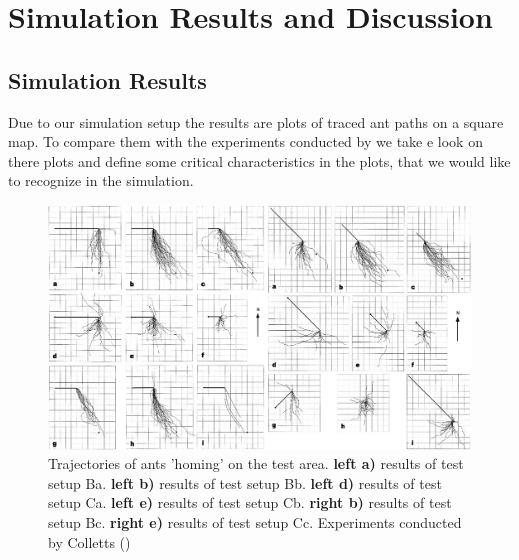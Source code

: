 \documentclass[11pt]{article}
\begin{document}
\section{Simulation Results and Discussion}
	\subsection{Simulation Results} %
		Due to our simulation setup the results are plots of traced ant paths on a square map. To compare them with the experiments conducted by \cite{wehner} we take e look on there plots and define some critical characteristics in the plots, that we would like to recognize in the simulation.
\begin{figure}[H]
	\includegraphics[width=1\textwidth]{p1-2.png}
	\caption{Trajectories of ants 'homing' on the test area. \textbf{left a)} results of test setup Ba. \textbf{left b)} results of test setup Bb. \textbf{left d)} results of test setup Ca.  \textbf{left e)} results of test setup Cb. \textbf{right b)} results of test setup Bc.  \textbf{right e)} results of test setup Cc. Experiments conducted by Colletts (\cite{wehner})}
	\label{fig:results experiment test B and C}
\end{figure}
\end{document}

